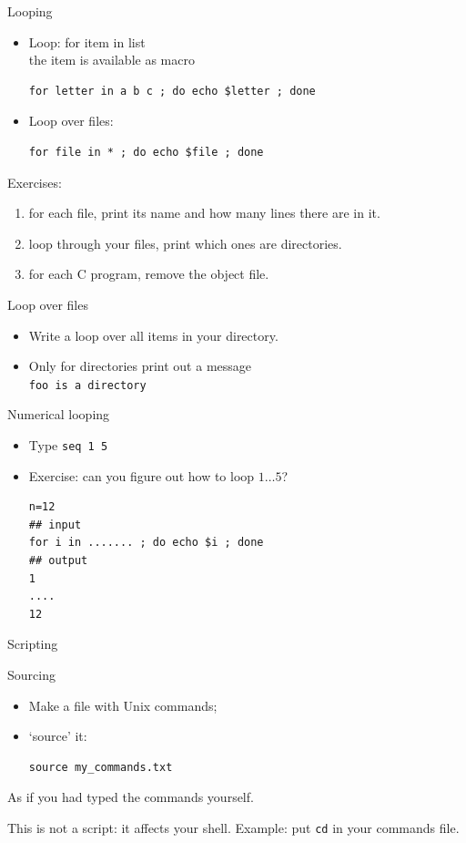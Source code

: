 \documentclass[11pt,headernav]{beamer}
\begin{document}
\begin{numberedframe}{Looping}
  \label{sl-lnx:for}
  \begin{itemize}
  \item Loop: for item in list\\
    the item is available as macro
\begin{lstlisting}
for letter in a b c ; do echo $letter ; done
\end{lstlisting}
\item Loop over files:
\begin{lstlisting}
for file in * ; do echo $file ; done
\end{lstlisting}
  \end{itemize}
  Exercises:
  \begin{enumerate}
  \item for each file, print its name and how many lines there are in it.
  \item loop through your files, print which ones are directories.
  \item for each C program, remove the object file.
  \end{enumerate}
\end{numberedframe}

\begin{exerciseframe}{Loop over files}
  \begin{itemize}
  \item
    Write a loop over all items in your directory.
  \item Only for directories print out a message\\
    \lstinline{foo is a directory}
  \end{itemize}
\end{exerciseframe}

\begin{numberedframe}{Numerical looping}

  \begin{itemize}
  \item Type \lstinline{seq 1 5}
  \item Exercise: can you figure out how to loop $1\ldots5$?
\begin{lstlisting}
n=12
## input
for i in ....... ; do echo $i ; done
## output
1
....
12
\end{lstlisting}
  \end{itemize}
\end{numberedframe}

 {Scripting}

\begin{numberedframe}{Sourcing}
  \begin{itemize}
  \item Make a file with Unix commands;
  \item `source' it:
\begin{lstlisting}
source my_commands.txt      
\end{lstlisting}
  \end{itemize}
  As if you had typed the commands yourself.

  This is not a script: it affects your shell.
  Example: put \lstinline{cd} in your commands file.
\end{numberedframe}
\end{document}
